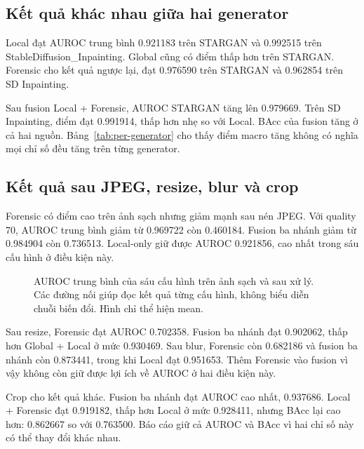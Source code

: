 \subsection{Kết quả khác nhau giữa hai generator}
Local đạt AUROC trung bình 0.921183 trên STARGAN và 0.992515 trên StableDiffusion\_\allowbreak Inpainting. Global cũng có điểm thấp hơn trên STARGAN. Forensic cho kết quả ngược lại, đạt 0.976590 trên STARGAN và 0.962854 trên SD Inpainting.

Sau fusion Local + Forensic, AUROC STARGAN tăng lên 0.979669. Trên SD Inpainting, điểm đạt 0.991914, thấp hơn nhẹ so với Local. BAcc của fusion tăng ở cả hai nguồn. Bảng~\ref{tab:per-generator} cho thấy điểm macro tăng không có nghĩa mọi chỉ số đều tăng trên từng generator.

\subsection{Kết quả sau JPEG, resize, blur và crop}
Forensic có điểm cao trên ảnh sạch nhưng giảm mạnh sau nén JPEG. Với quality 70, AUROC trung bình giảm từ 0.969722 còn 0.460184. Fusion ba nhánh giảm từ 0.984904 còn 0.736513. Local-only giữ được AUROC 0.921856, cao nhất trong sáu cấu hình ở điều kiện này.

\begin{table}[H]
\centering
\caption{Macro AUROC trung bình qua ba seed. Mỗi phép biến đổi được áp dụng riêng. G là Global, L là Local và F là Forensic.}
\label{tab:robustness-auroc}

\end{table}

\begin{figure}[H]
\centering

\caption{AUROC trung bình của sáu cấu hình trên ảnh sạch và sau xử lý. Các đường nối giúp đọc kết quả từng cấu hình, không biểu diễn chuỗi biến đổi. Hình chỉ thể hiện mean.}
\label{fig:robustness}
\end{figure}

Sau resize, Forensic đạt AUROC 0.702358. Fusion ba nhánh đạt 0.902062, thấp hơn Global + Local ở mức 0.930469. Sau blur, Forensic còn 0.682186 và fusion ba nhánh còn 0.873441, trong khi Local đạt 0.951653. Thêm Forensic vào fusion vì vậy không còn giữ được lợi ích về AUROC ở hai điều kiện này.

Crop cho kết quả khác. Fusion ba nhánh đạt AUROC cao nhất, 0.937686. Local + Forensic đạt 0.919182, thấp hơn Local ở mức 0.928411, nhưng BAcc lại cao hơn: 0.862667 so với 0.763500. Báo cáo giữ cả AUROC và BAcc vì hai chỉ số này có thể thay đổi khác nhau.

